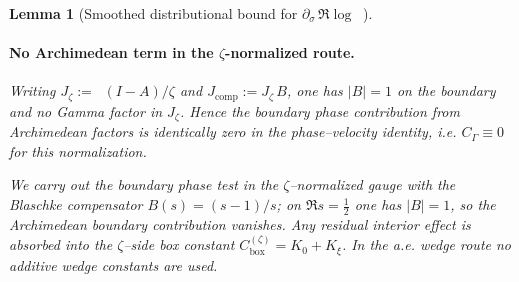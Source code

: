 \documentclass[11pt]{article}
\newtheorem{lemma}[theorem]{Lemma}
\theoremstyle{definition}
\theoremstyle{remark}
\DeclareMathOperator{\dettwo}{det_2}
\begin{document}
\begin{lemma}[Smoothed distributional bound for $\partial_\sigma\,\Re\log\dettwo$]
\paragraph{No Archimedean term in the \(\zeta\)-normalized route.}
Writing \(J_\zeta:=\dettwo(I-A)/\zeta\) and \(J_{\mathrm{comp}}:=J_\zeta\,B\), one has \(|B|=1\) on the boundary and no Gamma factor in \(J_\zeta\). Hence the boundary phase contribution from Archimedean factors is identically zero in the phase–velocity identity, i.e. \(C_\Gamma\equiv 0\) for this normalization.

We carry out the boundary phase test in the $\zeta$–normalized gauge with the Blaschke compensator $B(s)=(s-1)/s$; on $\Re s=\tfrac12$ one has $|B|=1$, so the Archimedean boundary contribution vanishes. Any residual interior effect is absorbed into the $\zeta$–side box constant $C_{\mathrm{box}}^{(\zeta)}=K_0+K_\xi$. In the a.e. wedge route no additive wedge constants are used.


\end{lemma}
\end{document}
